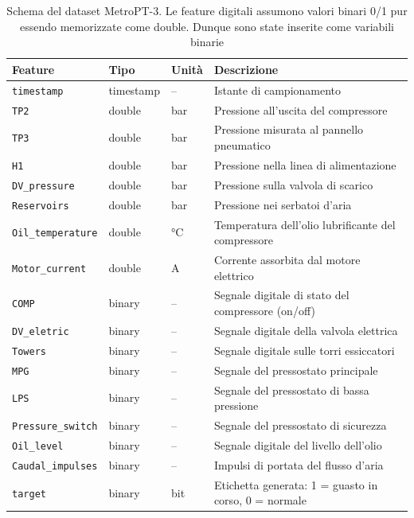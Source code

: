 \documentclass[../main.tex]{subfiles}
\begin{document}
\begin{table}[H]
\centering
\begin{tabular}{|l|l|l|p{6cm}|}
\hline
\textbf{Feature} & \textbf{Tipo} & \textbf{Unità} & \textbf{Descrizione} \\
\hline
\texttt{timestamp}        & timestamp & --      & Istante di campionamento \\ \hline
\texttt{TP2}              & double    & bar     & Pressione all'uscita del compressore \\ \hline
\texttt{TP3}              & double    & bar     & Pressione misurata al pannello pneumatico \\ \hline
\texttt{H1}               & double    & bar     & Pressione nella linea di alimentazione \\ \hline
\texttt{DV\_pressure}     & double    & bar     & Pressione sulla valvola di scarico \\ \hline
\texttt{Reservoirs}       & double    & bar     & Pressione nei serbatoi d'aria \\ \hline
\texttt{Oil\_temperature} & double    & °C      & Temperatura dell'olio lubrificante del compressore \\ \hline
\texttt{Motor\_current}   & double    & A       & Corrente assorbita dal motore elettrico \\ \hline
\texttt{COMP}             & binary    & --      & Segnale digitale di stato del compressore (on/off) \\ \hline
\texttt{DV\_eletric}      & binary    & --      & Segnale digitale della valvola elettrica \\ \hline
\texttt{Towers}           & binary    & --      & Segnale digitale sulle torri essiccatori \\ \hline
\texttt{MPG}              & binary    & --      & Segnale del pressostato principale \\ \hline
\texttt{LPS}              & binary    & --      & Segnale del pressostato di bassa pressione \\ \hline
\texttt{Pressure\_switch} & binary    & --      & Segnale del pressostato di sicurezza \\ \hline
\texttt{Oil\_level}       & binary    & --      & Segnale digitale del livello dell'olio \\ \hline
\texttt{Caudal\_impulses} & binary    & --     & Impulsi di portata del flusso d'aria \\ \hline
\texttt{target}           & binary    & bit     & Etichetta generata: 1 = guasto in corso, 0 = normale \\ \hline
\end{tabular}
\caption{Schema del dataset MetroPT-3. Le feature digitali assumono valori binari 0/1 pur essendo memorizzate come double. Dunque sono state inserite come variabili binarie}
\label{tab:schema-metrodt}
\end{table}
\end{document}

